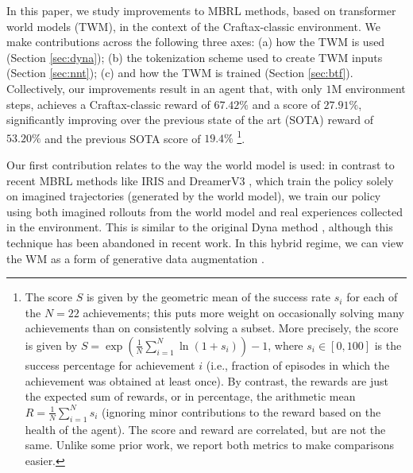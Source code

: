 In this paper, we study improvements to MBRL methods,
based on transformer world models (TWM),
in the context of the Craftax-classic environment.
We make contributions across
the following three axes:
(a) how the TWM is used (Section \ref{sec:dyna});
(b) the tokenization scheme used to create TWM inputs
(Section \ref{sec:nnt});
(c) and how the TWM is trained (Section \ref{sec:btf}).
Collectively, our improvements result in an agent that,
with only $1$M environment steps,
achieves a Craftax-classic reward of $67.42\%$ and a
score of $27.91\%$,
significantly improving over the previous state of the art (SOTA) reward of $53.20\%$ \citep{hafner2023mastering} and the previous SOTA score of $19.4\%$ \citep{Kauvar2023}\footnote{The score $S$ is given by the geometric mean
of the success rate $s_i$ for each of the
$N=22$ achievements;
this
 puts more weight on occasionally
solving many achievements than on consistently solving
a subset.
More precisely, the score is given by
$S = \exp \left(\frac{1}{N} \sum_{i=1}^N
\ln (1+s_i) \right)-1$,
where $s_i \in [0,100]$ is the success percentage
for achievement $i$
(i.e., fraction of episodes in which
the achievement was obtained at least once).
By contrast, the rewards are just the expected sum of rewards, or in percentage, the arithmetic mean
$R=\frac{1}{N} \sum_{i=1}^N s_i$
(ignoring minor contributions to
the reward based on
 the health of the agent).
 The score and reward are correlated, but are not the same. Unlike some prior work, we report both metrics to make comparisons easier.
}.



Our first contribution relates to the way the world model is used:
in contrast to recent MBRL methods like IRIS \citep{micheli2022transformers} and DreamerV3 \citep{hafner2023mastering}, which train the policy solely on imagined trajectories (generated by the world model), we train our policy using both imagined rollouts from the world model and real experiences collected in the environment.
This is similar to the original Dyna method \citep{sutton1990integrated}, although this technique has been abandoned in recent work.
In this hybrid regime, we can view the WM as a form
of generative data augmentation
\citep{van2019use}.


